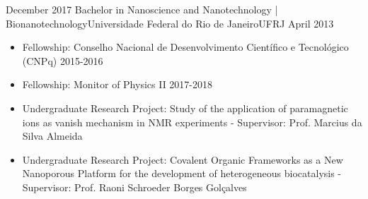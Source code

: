 \begin{experiences}
  \experience
    {December 2017}   {Bachelor in Nanoscience and Nanotechnology | Bionanotechnology}{Universidade Federal do Rio de Janeiro}{UFRJ}
    {April 2013} {
                      \begin{itemize}
                        \item Fellowship: Conselho Nacional de Desenvolvimento Científico e Tecnológico (CNPq) 2015-2016                        
                        \item Fellowship: Monitor of Physics II 2017-2018               \item Undergraduate Research Project: Study of the application of paramagnetic ions as vanish mechanism in NMR experiments
                            \subitem - Supervisor: Prof. Marcius da Silva Almeida
                        \item Undergraduate Research Project: Covalent Organic Frameworks as a New Nanoporous Platform for the development of heterogeneous biocatalysis
                            \subitem - Supervisor: Prof. Raoni Schroeder Borges Golçalves
                        
                      \end{itemize}
                    }{}
  \emptySeparator
\end{experiences}